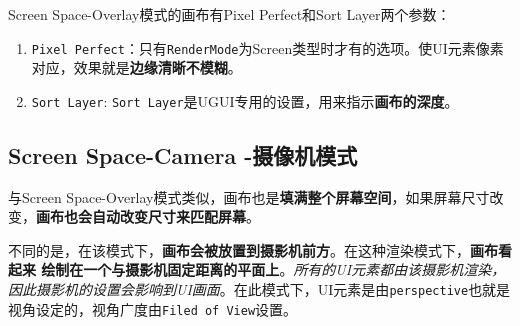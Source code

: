 \documentclass[UTF8,a4paper,12pt]{ctexbook}
\begin{document}
			Screen Space-Overlay模式的画布有Pixel Perfect和Sort Layer两个参数：
			\begin{enumerate}[itemindent = 1em]
				\item \verb|Pixel Perfect|：只有\verb|RenderMode|为Screen类型时才有的选项。使UI元素像素对应，效果就是\textbf{边缘清晰不模糊}。
				\item \verb|Sort Layer|: \verb|Sort Layer|是UGUI专用的设置，用来指示\textbf{画布的深度}。
			\end{enumerate}
		
		\subsection{Screen Space-Camera -摄像机模式}
			与Screen Space-Overlay模式类似，画布也是\textbf{填满整个屏幕空间}，如果屏幕尺寸改变，\textbf{画布也会自动改变尺寸来匹配屏幕}。
			
			不同的是，在该模式下，\textbf{画布会被放置到摄影机前方}。在这种渲染模式下，\textbf{画布看起来 绘制在一个与摄影机固定距离的平面上}。\textit{所有的UI元素都由该摄影机渲染，因此摄影机的设置会影响到UI画面}。在此模式下，UI元素是由\verb|perspective|也就是视角设定的，视角广度由\verb|Filed of View|设置。
			
\end{document}
